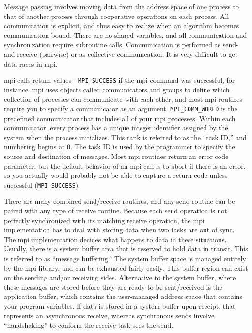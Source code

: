 \documentclass[10pt]{article}
\begin{document}
\begin{flushleft}
Message passing involves moving data from the address space of one process to that of another process through cooperative operations on each process. All communication is explicit, and thus easy to realize when an algorithm becomes communication-bound. There are no shared variables, and all communication and synchronization require subroutine calls. Communication is performed as send-and-receive (pairwise) or as collective communication. It is very difficult to get data races in \gls{mpi}.

 \gls{mpi} calls return values - {\tt MPI\_SUCCESS} if the \gls{mpi} command was successful, for instance. \gls{mpi} uses objects called communicators and groups to define which collection of processes can communicate with each other, and most \gls{mpi} routines require you to specify a communicator as an argument. {\tt MPI\_COMM\_WORLD} is the predefined communicator that includes all of your \gls{mpi} processes. Within each communicator, every process has a unique integer identifier assigned by the system when the process initializes. This rank is referred to as the ``task ID,'' and numbering begins at 0. The task ID is used by the programmer to specify the source and destination of messages. Most \gls{mpi} routines return an error code parameter, but the default behavior of an \gls{mpi} call is to abort if there is an error, so you actually would probably not be able to capture a return code unless successful ({\tt MPI\_SUCCESS}). 

There are many combined send/receive routines, and any send routine can be paired with any type of receive routine. Because each send operation is not perfectly synchronized with its matching receive operation, the \gls{mpi} implementation has to deal with storing data when two tasks are out of sync. The \gls{mpi} implementation decides what happens to data in these situations. Usually, there is a system buffer area that is reserved to hold data in transit. This is referred to as ``message buffering.'' The system buffer space is managed entirely by the \gls{mpi} library, and can be exhausted fairly easily. This buffer region can exist on the sending and/or receiving sides. Alternative to the system buffer, where these messages are stored before they are ready to be sent/received is the application buffer, which contains the user-managed address space that contains your program variables. If data is stored in a system buffer upon receipt, that represents an asynchronous receive, whereas synchronous sends involve ``handshaking'' to conform the receive task sees the send.


\end{flushleft}
\end{document}
